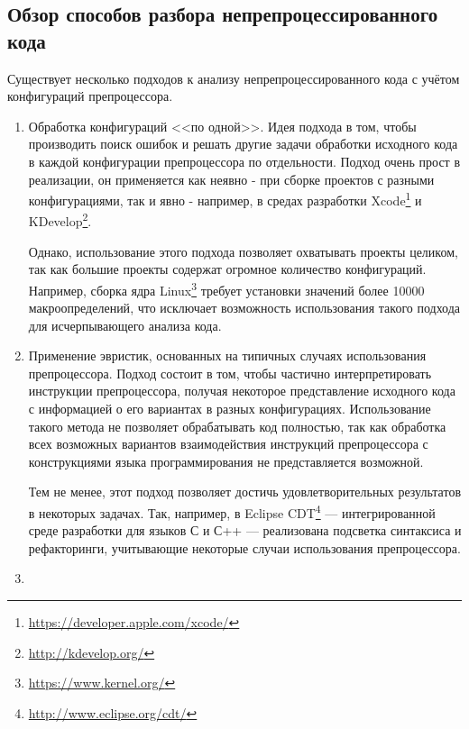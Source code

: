\subsection{Обзор способов разбора непрепроцессированного кода}
\label{subsec:unpreprocessed_parsing_methods}

Существует несколько подходов к анализу непрепроцессированного кода с учётом конфигураций препроцессора.

\begin{enumerate}

\item 

Обработка конфигураций <<по одной>>. Идея подхода в том, чтобы производить поиск ошибок и решать другие задачи обработки исходного кода в каждой конфигурации препроцессора по отдельности. Подход очень прост в реализации, он применяется как неявно - при сборке проектов с разными конфигурациями, так и явно - например, в средах разработки Xcode\footnote{\url{https://developer.apple.com/xcode/}} и KDevelop\footnote{\url{http://kdevelop.org/}}.

Однако, использование этого подхода позволяет охватывать проекты целиком, так как большие проекты содержат огромное количество конфигураций. Например, сборка ядра Linux\footnote{\url{https://www.kernel.org/}} требует установки значений более 10000 макроопределений\cite{typechef}, что исключает возможность использования такого подхода для исчерпывающего анализа кода.

\item

Применение эвристик, основанных на типичных случаях использования препроцессора. Подход состоит в том, чтобы частично интерпретировать инструкции препроцессора, получая некоторое представление исходного кода с информацией о его вариантах в разных конфигурациях. Использование такого метода не позволяет обрабатывать код полностью, так как обработка всех возможных вариантов взаимодействия инструкций препроцессора с конструкциями языка программирования не представляется возможной.

Тем не менее, этот подход позволяет достичь удовлетворительных результатов в некоторых задачах. Так, например, в Eclipse CDT\footnote{\url{http://www.eclipse.org/cdt/}} --- интегрированной среде разработки для языков С и С++ --- реализована подсветка синтаксиса и рефакторинги, учитывающие некоторые случаи использования препроцессора.

\item


\end{enumerate}
